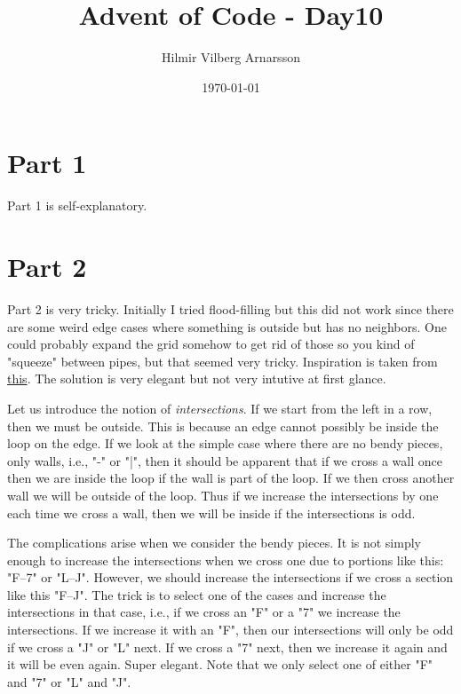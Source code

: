 \documentclass{article}
\begin{document}
\title{Advent of Code - Day10}
\author{Hilmir Vilberg Arnarsson}
\date{\today}

\maketitle
\clearpage
\setlength{\parskip}{1em}


\section*{Part 1}
Part 1 is self-explanatory.

\section*{Part 2}
Part 2 is very tricky. Initially I tried flood-filling but this did not work since there are some 
weird edge cases where something is outside but has no neighbors. One could probably expand the grid somehow
to get rid of those so you kind of "squeeze" between pipes, but that seemed very tricky. Inspiration
is taken from \href{https://stackoverflow.com/questions/217578/how-can-i-determine-whether-a-2d-point-is-within-a-polygon}{this}. The solution is very elegant but not very intutive at first glance.

Let us introduce the notion of \textit{intersections}. If we start from the left in a row, then we must be outside.
This is because an edge cannot possibly be inside the loop on the edge. If we look at the simple case where
there are no bendy pieces, only walls, i.e., "-" or "|", then it should be apparent that if we cross a wall once
then we are inside the loop if the wall is part of the loop. If we then cross another wall we will be outside of 
the loop. Thus if we increase the intersections by one each time we cross a wall, then we will be inside if the intersections is odd.

The complications arise when we consider the bendy pieces. It is not simply enough to increase the intersections when
we cross one due to portions like this: "F--7" or "L--J". However, we should increase the intersections if we cross
a section like this "F--J". The trick is to select one of the cases and increase the intersections in that case, i.e.,
if we cross an "F" or a "7" we increase the intersections. If we increase it with an "F", then our intersections will only be odd
if we cross a "J" or "L" next. If we cross a "7" next, then we increase it again and it will be even again. Super elegant.
Note that we only select one of either "F" and "7" or "L" and "J".
\end{document}
